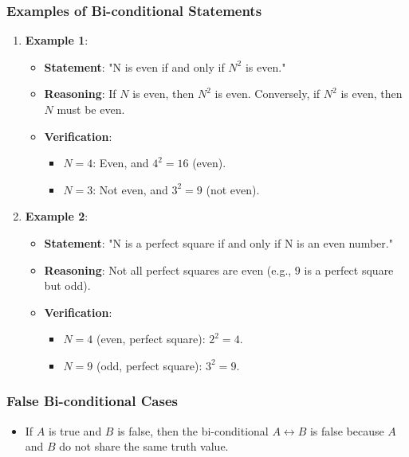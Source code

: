 \documentclass{article}
\begin{document}
\subsubsection{Examples of Bi-conditional Statements}
\begin{enumerate}
    \item \textbf{Example 1}:
    \begin{itemize}
        \item \textbf{Statement}: "N is even if and only if $N^2$ is even."
        \item \textbf{Reasoning}: If $N$ is even, then $N^2$ is even. Conversely, if $N^2$ is even, then $N$ must be even.
        \item \textbf{Verification}:
        \begin{itemize}
            \item $N = 4$: Even, and $4^2 = 16$ (even).
            \item $N = 3$: Not even, and $3^2 = 9$ (not even).
        \end{itemize}
    \end{itemize}
    
    \item \textbf{Example 2}:
    \begin{itemize}
        \item \textbf{Statement}: "N is a perfect square if and only if N is an even number."
        \item \textbf{Reasoning}: Not all perfect squares are even (e.g., $9$ is a perfect square but odd).
        \item \textbf{Verification}:
        \begin{itemize}
            \item $N = 4$ (even, perfect square): $2^2 = 4$.
            \item $N = 9$ (odd, perfect square): $3^2 = 9$.
        \end{itemize}
    \end{itemize}
\end{enumerate}

\subsubsection{False Bi-conditional Cases}
\begin{itemize}
    \item If $A$ is true and $B$ is false, then the bi-conditional $A \leftrightarrow B$ is false because $A$ and $B$ do not share the same truth value.
\end{itemize}
\end{document}
